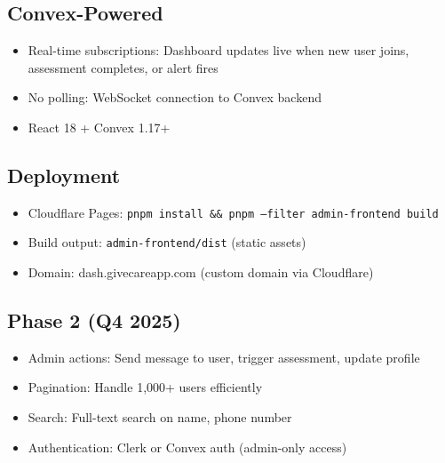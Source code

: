 \documentclass{article}
\begin{document}
\subsection*{Convex-Powered}
\begin{itemize}
    \item Real-time subscriptions: Dashboard updates live when new user joins, assessment completes, or alert fires
    \item No polling: WebSocket connection to Convex backend
    \item React 18 + Convex 1.17+
\end{itemize}

\subsection*{Deployment}
\begin{itemize}
    \item Cloudflare Pages: \texttt{pnpm install \&\& pnpm --filter admin-frontend build}
    \item Build output: \texttt{admin-frontend/dist} (static assets)
    \item Domain: dash.givecareapp.com (custom domain via Cloudflare)
\end{itemize}

\subsection*{Phase 2 (Q4 2025)}
\begin{itemize}
    \item Admin actions: Send message to user, trigger assessment, update profile
    \item Pagination: Handle 1,000+ users efficiently
    \item Search: Full-text search on name, phone number
    \item Authentication: Clerk or Convex auth (admin-only access)
\end{itemize}
\end{document}
